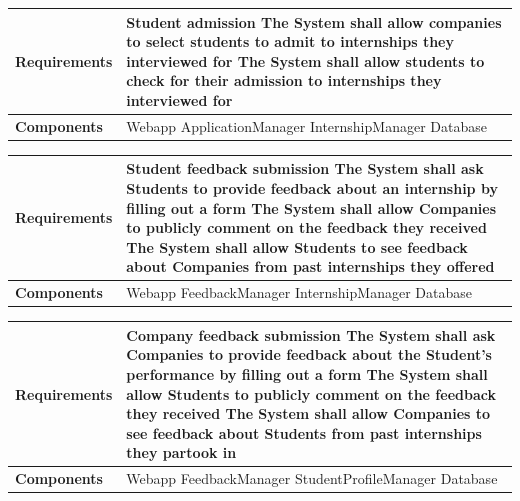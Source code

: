\begin{tabular}{|p{3cm}|p{9cm}|}
    \hline
\textbf{Requirements} & \textbf{Student admission} \newline [R21] The System shall allow companies to select students to admit to internships they interviewed for \newline [R22] The System shall allow students to check for their admission to internships they interviewed for \\  \hline
    \textbf{Components} & Webapp \newline ApplicationManager \newline InternshipManager \newline Database \\ \hline
    \end{tabular}
    \newline
    \newline

\begin{tabular}{|p{3cm}|p{9cm}|}
    \hline
\textbf{Requirements} & \textbf{Student feedback submission} \newline [R23] The System shall ask Students to provide feedback about an internship by filling out a form \newline [R24] The System shall allow Companies to publicly comment on the feedback they received \newline [R25] The System shall allow Students to see feedback about Companies from past internships they offered \\  \hline
    \textbf{Components} & Webapp \newline FeedbackManager \newline InternshipManager \newline Database \\ \hline
    \end{tabular}
    \newline
    \newline

\begin{tabular}{|p{3cm}|p{9cm}|}
    \hline
\textbf{Requirements} & \textbf{Company feedback submission} \newline [R26] The System shall ask Companies to provide feedback about the Student's performance by filling out a form \newline [R27] The System shall allow Students to publicly comment on the feedback they received  \newline [R28] The System shall allow Companies to see feedback about Students from past internships they partook in \\  \hline
    \textbf{Components} & Webapp \newline FeedbackManager \newline StudentProfileManager \newline Database \\ \hline
    \end{tabular}
    \newline
    \newline

